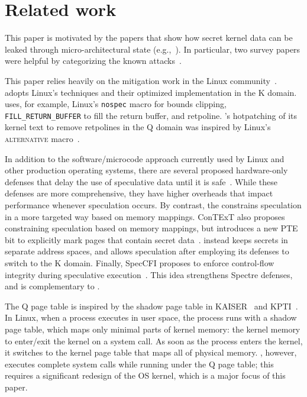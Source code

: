 \section*{Related work}

This paper is motivated by the papers that show how secret kernel data
can be leaked through micro-architectural state
(e.g.,~\cite{lipp:meltdown, kocher:spectre, bulck:foreshadow,
  schaik:ridl,canella:fallout,schwarz:zombieload}).  In particular,
two survey papers were helpful by categorizing the known
attacks~\cite{hill:survey,sok:transient}.

This paper relies heavily on the mitigation work in the Linux
community~\cite{linux:vuln}. \sys adopts Linux's techniques and their
optimized implementation in the K domain.  \sys uses, for example,
Linux's \texttt{nospec} macro for bounds clipping,
\texttt{FILL\_RETURN\_BUFFER} to fill the return buffer, and retpoline.
\sys's hotpatching of its kernel text to remove retpolines in the Q
domain was inspired by Linux's \textsc{alternative}
macro~\cite{lwn:alternative}.

In addition to the software/microcode approach currently used by Linux
and other production operating systems, there are several proposed
hardware-only defenses that delay the use of speculative data until
it is safe~\cite{barber:specshield, weisse:nda, yu:stt}. While these defenses are
more comprehensive, they have higher overheads that impact performance whenever
speculation occurs. By contrast, the \contract constrains speculation in a more
targeted way based on memory mappings. ConTExT also proposes constraining
speculation based on memory mappings, but introduces a new PTE bit to explicitly
mark pages that contain secret data~\cite{ConTExT}. \sys instead keeps secrets in
separate address spaces, and allows speculation after employing its defenses to
switch to the K domain.  Finally, SpecCFI proposes to enforce control-flow
integrity during speculative execution~\cite{koruyeh:speccfi}. This idea strengthens
Spectre defenses, and is complementary to \sys. 

The Q page table is inspired by the shadow page table in
KAISER~\cite{gruss:kaiser} and KPTI~\cite{linux:kpti}. In Linux, when
a process executes in user space, the process runs with a shadow
page table, which maps only minimal parts of kernel memory: the kernel
memory to enter/exit the kernel on a system call. As soon as the process
enters the kernel, it switches to the kernel page table that maps all
of physical memory.  \sys, however, executes complete system
calls while running under the Q page table; this requires a significant
redesign of the OS kernel, which is a major focus of this paper.

